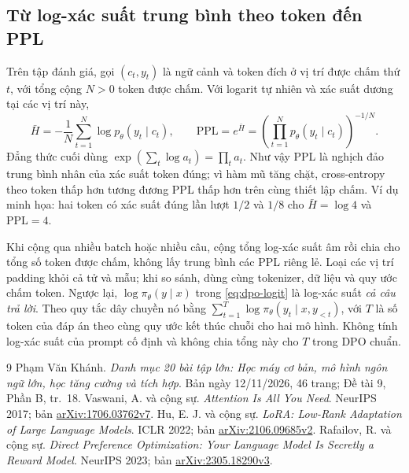 \documentclass[11pt,a4paper]{article}
\newcommand{\PPL}{\mathrm{PPL}}
\begin{document}
\subsection*{Từ log-xác suất trung bình theo token đến PPL}
Trên tập đánh giá, gọi $(c_t,y_t)$ là ngữ cảnh và token đích ở vị trí được chấm thứ $t$, với tổng cộng $N>0$ token được chấm. Với logarit tự nhiên và xác suất dương tại các vị trí này,
\begin{equation}
  \bar H=-\frac{1}{N}\sum_{t=1}^{N}\log p_\theta(y_t\mid c_t),\qquad
  \PPL=e^{\bar H}
    =\left(\prod_{t=1}^{N} p_\theta(y_t\mid c_t)\right)^{-1/N}.
  \label{eq:ppl}
\end{equation}
Đẳng thức cuối dùng $\exp(\sum_t\log a_t)=\prod_t a_t$. Như vậy PPL là nghịch đảo trung bình nhân của xác suất token đúng; vì hàm mũ tăng chặt, cross-entropy theo token thấp hơn tương đương PPL thấp hơn trên cùng thiết lập chấm. Ví dụ minh họa: hai token có xác suất đúng lần lượt $1/2$ và $1/8$ cho $\bar H=\log 4$ và $\PPL=4$.

Khi cộng qua nhiều batch hoặc nhiều câu, cộng tổng log-xác suất âm rồi chia cho tổng số token được chấm, không lấy trung bình các PPL riêng lẻ. Loại các vị trí padding khỏi cả tử và mẫu; khi so sánh, dùng cùng tokenizer, dữ liệu và quy ước chấm token. Ngược lại, $\log\pi_\theta(y\mid x)$ trong \eqref{eq:dpo-logit} là log-xác suất \emph{cả câu trả lời}. Theo quy tắc dây chuyền nó bằng $\sum_{t=1}^{T}\log\pi_\theta(y_t\mid x,y_{<t})$, với $T$ là số token của đáp án theo cùng quy ước kết thúc chuỗi cho hai mô hình. Không tính log-xác suất của prompt cố định và không chia tổng này cho $T$ trong DPO chuẩn.

\begin{thebibliography}{9}
Phạm Văn Khánh. \emph{Danh mục 20 bài tập lớn: Học máy cơ bản, mô hình ngôn ngữ lớn, học tăng cường và tích hợp}. Bản ngày 12/11/2026, 46 trang; Đề tài 9, Phần B, tr.~18.
Vaswani, A. và cộng sự. \emph{Attention Is All You Need}. NeurIPS 2017; bản \href{https://arxiv.org/abs/1706.03762v7}{arXiv:1706.03762v7}.
Hu, E. J. và cộng sự. \emph{LoRA: Low-Rank Adaptation of Large Language Models}. ICLR 2022; bản \href{https://arxiv.org/abs/2106.09685v2}{arXiv:2106.09685v2}.
Rafailov, R. và cộng sự. \emph{Direct Preference Optimization: Your Language Model Is Secretly a Reward Model}. NeurIPS 2023; bản \href{https://arxiv.org/abs/2305.18290v3}{arXiv:2305.18290v3}.
\end{thebibliography}
\end{document}
